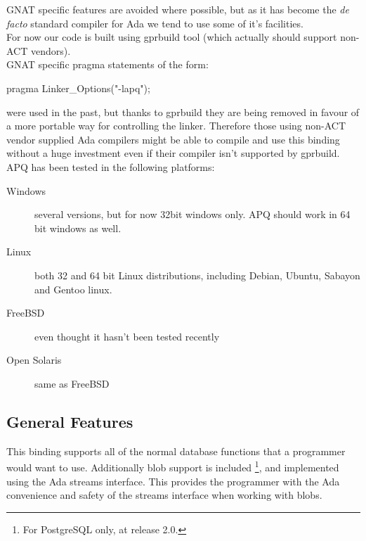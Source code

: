 \documentclass[english,letterpaper]{book}
\begin{document}
GNAT specific features are avoided where possible, but as it has become the \emph{de facto}
standard compiler for Ada we tend to use some of it's facilities.\\


For now our code is built using gprbuild tool (which actually should support 
non-ACT vendors).\\

GNAT specific pragma statements of the form:\\

\begin{Code}

   pragma Linker_Options("-lapq");

\end{Code}


were used in the past, but thanks to gprbuild they are being removed in favour of a more
portable way for controlling the linker. Therefore those using non-ACT vendor
supplied Ada compilers might be able to compile and use this binding
without a huge investment even if their compiler isn't supported by gprbuild.\\


APQ has been tested in the following platforms:

\begin{description}
	\item [Windows] several versions, but for now 32bit windows only. APQ should work in 64 bit windows as well.
	\item [Linux] both 32 and 64 bit Linux distributions, including Debian, Ubuntu, Sabayon and Gentoo linux.
	\item [FreeBSD] even thought it hasn't been tested recently
	\item [Open Solaris] same as FreeBSD
\end{description}


\subsection{General Features}

This binding supports all of the normal database functions that a
programmer would want to use. Additionally blob support
is included%
\footnote{For PostgreSQL only, at release 2.0.%
}, and implemented using the Ada streams interface.
This provides the programmer with the Ada convenience and safety of
the streams interface when working with blobs.\\
\end{document}
